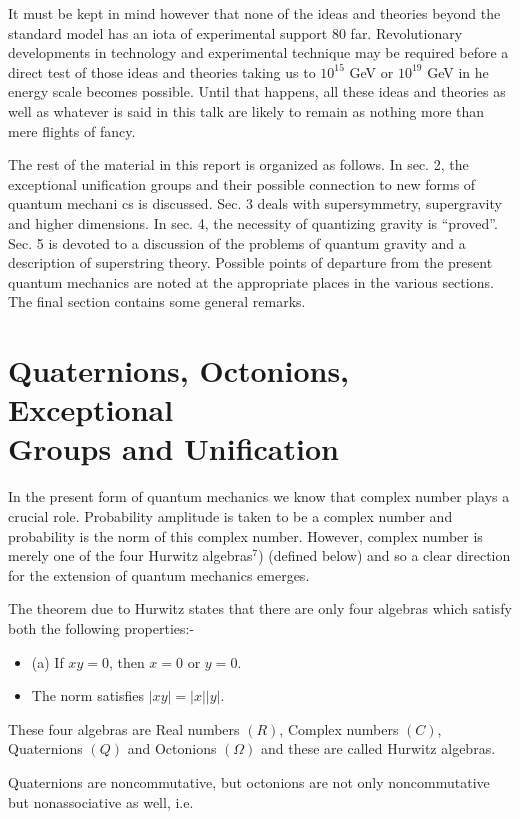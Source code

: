 It must be kept in mind however that none of the ideas and theories beyond the
standard model has an iota of experimental support 80 far. Revolutionary developments
in technology and experimental technique may be required before a direct test
of those
ideas and theories taking us to $10^{15}$ GeV or $10^{19}$ GeV in he energy scale becomes possible.
Until that happens, all these ideas and theories as well as whatever is said in this
talk are
likely to remain as nothing more than mere flights of fancy.

The rest of the material in this report is organized as follows. In sec. 2, the exceptional
unification groups and their possible connection to new forms of quantum mechani
cs is
discussed. Sec. 3 deals with supersymmetry, supergravity and higher dimensions. In sec.
4, the necessity of quantizing gravity is “proved”. Sec. 5 is devoted to a discussion
of the
problems of quantum gravity and a description of superstring theory. Possible
points of
departure from the present quantum mechanics are noted at the appropriate places
in the
various sections. The final section contains some general remarks.

\section{Quaternions, Octonions, Exceptional\\ Groups and Unification}

In the present form of quantum mechanics we know that complex number plays a
crucial role. Probability amplitude is taken to be a complex number and probability is
the norm of this complex number.
However, complex number is merely one of the four
Hurwitz algebras$^{7}$) (defined below) and so a clear direction for the extension of quantum
mechanics emerges.

The theorem due to Hurwitz states that there are only four algebras which satisfy both
the following properties:-

\begin{itemize}
\item (a) If $xy = 0$, then $x=0$ or $y=0$.
\item The norm satisfies $|xy| = |x| |y|$.
\end{itemize}

These four algebras are Real numbers $(R)$, Complex numbers $(C)$, Quaternions $(Q)$ and
Octonions $(\Omega)$ and these are called Hurwitz algebras.

Quaternions are noncommutative,
but octonions are not only noncommutative but
nonassociative as well, i.e.

